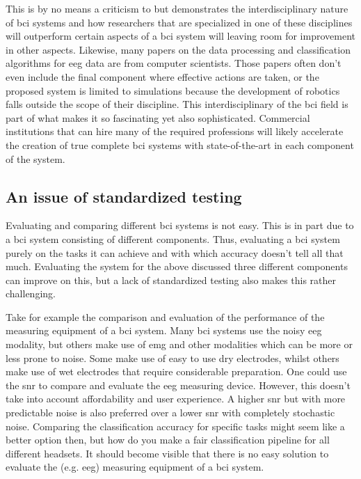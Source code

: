 This is by no means a criticism to \citet{complex_hand_few_classes} but demonstrates the interdisciplinary nature of \gls{bci} systems and how researchers that are specialized in one of these disciplines will outperform certain aspects of a \gls{bci} system will leaving room for improvement in other aspects.
Likewise, many papers on the data processing and classification algorithms for \gls{eeg} data are from computer scientists.
Those papers often don't even include the final component where effective actions are taken, or the proposed system is limited to simulations because the development of robotics falls outside the scope of their discipline.
This interdisciplinary of the \gls{bci} field is part of what makes it so fascinating yet also sophisticated.
Commercial institutions that can hire many of the required professions will likely accelerate the creation of true complete \gls{bci} systems with state-of-the-art in each component of the system.



\subsection{An issue of standardized testing}
\label{subsec:bci_small_projects_lack_of_testing}

Evaluating and comparing different \gls{bci} systems is not easy.
This is in part due to a \gls{bci} system consisting of different components.
Thus, evaluating a \gls{bci} system purely on the tasks it can achieve and with which accuracy doesn't tell all that much.
Evaluating the system for the above discussed three different components can improve on this, but a lack of standardized testing also makes this rather challenging.

Take for example the comparison and evaluation of the performance of the measuring equipment of a \gls{bci} system.
Many \gls{bci} systems use the noisy \gls{eeg} modality, but others make use of \gls{emg} and other modalities which can be more or less prone to noise. 
Some make use of easy to use dry electrodes, whilst others make use of wet electrodes that require considerable preparation.
One could use the \gls{snr} to compare and evaluate the \gls{eeg} measuring device.
However, this doesn't take into account affordability and user experience.
A higher \gls{snr} but with more predictable noise is also preferred over a lower \gls{snr} with completely stochastic noise.
Comparing the classification accuracy for specific tasks might seem like a better option then, but how do you make a fair classification pipeline for all different headsets.
It should become visible that there is no easy solution to evaluate the (e.g. \gls{eeg}) measuring equipment of a \gls{bci} system.

